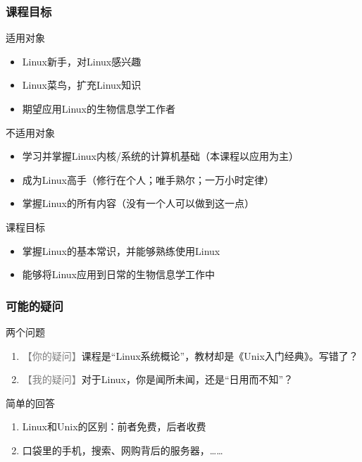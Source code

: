 \begin{frame}
  \frametitle{课程目标}
  \begin{block}{适用对象}
    \begin{itemize}
      \item Linux新手，对Linux感兴趣
      \item Linux菜鸟，扩充Linux知识
      \item 期望应用Linux的生物信息学工作者
    \end{itemize}
  \end{block}
  \pause
  \begin{block}{不适用对象}
    \begin{itemize}
      \item 学习并掌握Linux内核/系统的计算机基础（本课程以应用为主）
      \item 成为Linux高手（修行在个人；唯手熟尔；一万小时定律）
      \item 掌握Linux的所有内容（没有一个人可以做到这一点）
    \end{itemize}
  \end{block}
  \pause
  \begin{block}{课程目标}
    \begin{itemize}
      \item 掌握Linux的基本常识，并能够熟练使用Linux
      \item 能够将Linux应用到日常的生物信息学工作中
    \end{itemize}
  \end{block}
\end{frame}

\begin{frame}
  \frametitle{可能的疑问}
  \begin{block}{两个问题}
  \begin{enumerate}
    \item \textcolor{gray}{【你的疑问】}课程是“Linux系统概论”，教材却是《Unix入门经典》。写错了？
    \item \textcolor{gray}{【我的疑问】}对于Linux，你是闻所未闻，还是“日用而不知”？
  \end{enumerate}
\end{block}
  \pause
  \begin{block}{简单的回答}
  \begin{enumerate}
    \item Linux和Unix的区别：前者免费，后者收费
    \item 口袋里的手机，搜索、网购背后的服务器，……
  \end{enumerate}
\end{block}
\end{frame}


